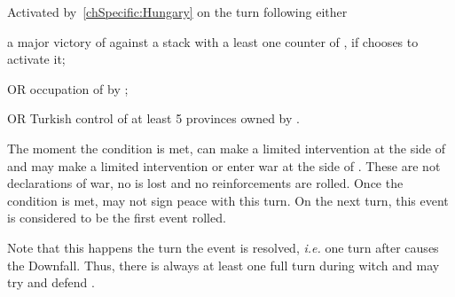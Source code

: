 

\activation{}
\aparag Activated by~\ref{chSpecific:Hungary} on the turn following either
\begin{modlist}
\item a major victory of \TUR against a stack with a least one \ARMY counter
  of \paysHongrie, if \TUR chooses to activate it;
\item[OR] occupation of \villeBuda by \TUR;
\item[OR] Turkish control of at least 5 provinces owned by \paysHongrie.
\end{modlist}
\bparag The moment the condition is met, \POL can make a limited intervention
at the side of \paysHongrie and \HAB may make a limited intervention or enter
war at the side of \paysHongrie. These are not declarations of war, no \STAB
is lost and no reinforcements are rolled.
\bparag Once the condition is met, \TUR may not sign peace with \paysHongrie
this turn.
\bparag On the next turn, this event is considered to be the first event
rolled.


\phpaix
\aparag Note that this happens the turn the event is resolved, \emph{i.e.} one
turn after \TUR causes the Downfall. Thus, there is always at least one full
turn during witch \HAB and \POL may try and defend \paysHongrie.

